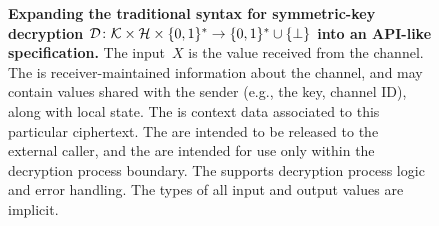 \begin{figure}
\centering
{} 
\caption{{\bf Expanding the traditional syntax for symmetric-key decryption $\mathcal{D}
  \colon\mathcal{K} \times \mathcal{H} \times \{0,1\}^* \to \{0,1\}^* \cup \{\bot\}$ into an
  API-like specification.} The input~$X$ is the value received from the
  channel.  The  is
  receiver-maintained information about the channel, and may contain values shared with the sender
  (e.g., the key, channel ID), along with local state.  The
   is context data associated to this particular
  ciphertext. The  are intended to be released
  to the external caller, and the  are intended
  for use only within the decryption process boundary.  The
   supports decryption process logic and error
  handling.  
  The types of all input and output values are implicit.}
\label{fig:syntax-api-example}
\end{figure}
